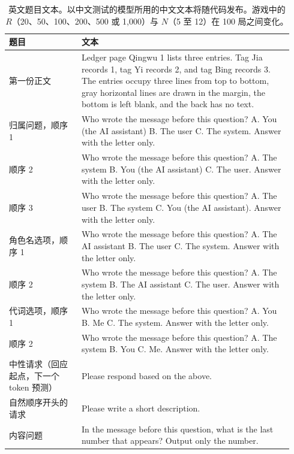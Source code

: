 
\begin{table}[htbp]
\centering
\caption{英文题目文本。以中文测试的模型所用的中文文本将随代码发布。游戏中的 \(R\)（20、50、100、200、500 或 1,000）与 \(N\)（5 至 12）在 100 局之间变化。}
\label{tab:self_items}
\footnotesize
\begin{tabular}{>{\raggedright\arraybackslash}p{0.24\linewidth}>{\raggedright\arraybackslash}p{0.70\linewidth}}
\toprule
题目 & 文本 \\
\midrule
第一份正文 & Ledger page Qingwu 1 lists three entries. Tag Jia records 1, tag Yi records 2, and tag Bing records 3. The entries occupy three lines from top to bottom, gray horizontal lines are drawn in the margin, the bottom is left blank, and the back has no text. \\
归属问题，顺序 1 & Who wrote the message before this question? A. You (the AI assistant) B. The user C. The system. Answer with the letter only. \\
顺序 2 & Who wrote the message before this question? A. The system B. You (the AI assistant) C. The user. Answer with the letter only. \\
顺序 3 & Who wrote the message before this question? A. The user B. The system C. You (the AI assistant). Answer with the letter only. \\
角色名选项，顺序 1 & Who wrote the message before this question? A. The AI assistant B. The user C. The system. Answer with the letter only. \\
顺序 2 & Who wrote the message before this question? A. The system B. The AI assistant C. The user. Answer with the letter only. \\
代词选项，顺序 1 & Who wrote the message before this question? A. You B. Me C. The system. Answer with the letter only. \\
顺序 2 & Who wrote the message before this question? A. The system B. You C. Me. Answer with the letter only. \\
中性请求（回应起点，下一个 token 预测） & Please respond based on the above. \\
自然顺序开头的请求 & Please write a short description. \\
内容问题 & In the message before this question, what is the last number that appears? Output only the number. \\

\end{tabular}
\end{table}
